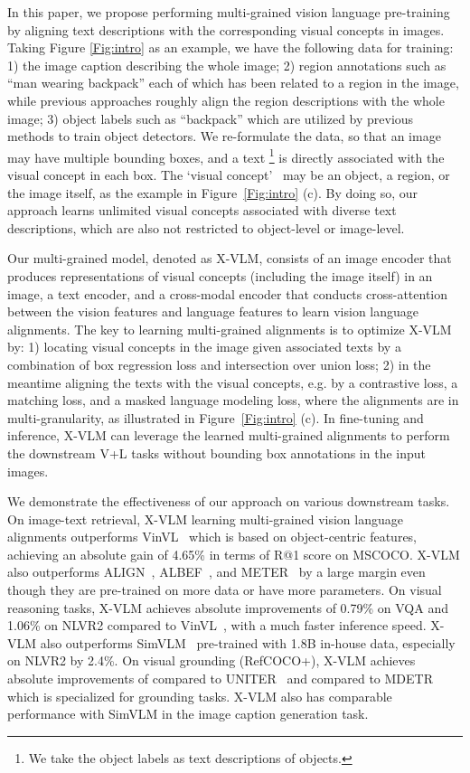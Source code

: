 \documentclass[nohyperref]{article}
\theoremstyle{plain}
\theoremstyle{definition}
\theoremstyle{remark}
\begin{document}
In this paper, we propose performing multi-grained vision language pre-training by aligning text descriptions with the corresponding visual concepts in images. Taking Figure \ref{Fig:intro} as an example, we have the following data for training: 1) the image caption describing the whole image; 2) region annotations such as ``man wearing backpack'' each of which has been related to a region in the image, while previous approaches roughly align the region descriptions with the whole image; 3) object labels such as ``backpack'' which are utilized by previous methods to train object detectors. We re-formulate the data, so that an image may have multiple bounding boxes, and a text \footnote{We take the object labels as text descriptions of objects.} is directly associated with the visual concept in each box. The `visual concept'~\cite{krishna2016visual, zhang2021vinvl, changpinyo2021conceptual} may be an object, a region, or the image itself, as the example in Figure~\ref{Fig:intro} (c). By doing so, our approach learns unlimited visual concepts associated with diverse text descriptions, which are also not restricted to object-level or image-level. 


Our multi-grained model, denoted as X-VLM, consists of an image encoder that produces representations of visual concepts (including the image itself) in an image, a text encoder, and a cross-modal encoder that conducts cross-attention between the vision features and language features to learn vision language alignments. The key to learning multi-grained alignments is to optimize X-VLM by: 1) locating visual concepts in the image given associated texts by a combination of box regression loss and intersection over union loss; 2) in the meantime aligning the texts with the visual concepts, e.g. by a contrastive loss, a matching loss, and a masked language modeling loss, where the alignments are in multi-granularity, as illustrated in Figure~\ref{Fig:intro} (c). In fine-tuning and inference, X-VLM can leverage the learned multi-grained alignments to perform the downstream V+L tasks without bounding box annotations in the input images.


We demonstrate the effectiveness of our approach on various downstream tasks. On image-text retrieval, X-VLM learning multi-grained vision language alignments outperforms VinVL~\cite{zhang2021vinvl} which is based on object-centric features, achieving an absolute gain of 4.65\% in terms of R@1 score on MSCOCO. X-VLM also outperforms ALIGN~\cite{jia2021scaling}, ALBEF~\cite{li2021align}, and METER~\cite{dou2021empirical} by a large margin even though they are pre-trained on more data or have more parameters. On visual reasoning tasks, X-VLM achieves absolute improvements of 0.79\% on VQA and 1.06\% on NLVR2 compared to VinVL~\cite{zhang2021vinvl}, with a much faster inference speed. X-VLM also outperforms SimVLM~\cite{wang2021simvlm} pre-trained with 1.8B in-house data, especially on NLVR2 by 2.4\%.  On visual grounding (RefCOCO+), X-VLM achieves absolute improvements of  compared to UNITER~\cite{chen2020uniter} and  compared to MDETR~\cite{kamath2021mdetr} which is specialized for grounding tasks. X-VLM also has comparable performance with SimVLM in the image caption generation task. 
\end{document}
